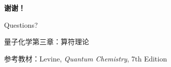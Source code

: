 \documentclass[aspectratio=169, 10pt]{beamer}
\begin{document}
\begin{frame}[plain]
  \begin{center}
    \vspace*{2cm}
    {\Huge\color{iqbblue}\textbf{谢谢！}}

    \vspace{1cm}

    {\Large Questions?}

    \vspace{2cm}

    {\large 量子化学第三章：算符理论}

    \vspace{0.5cm}

    {\normalsize 参考教材：Levine, \textit{Quantum Chemistry}, 7th Edition}
  \end{center}
\end{frame}
\end{document}
